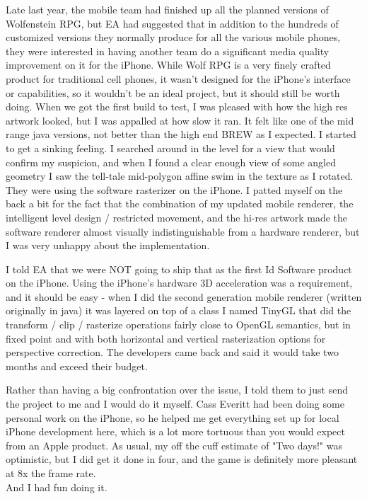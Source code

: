 Late last year, the mobile team had finished up all the planned versions of Wolfenstein RPG, but EA had suggested that in addition to the hundreds of customized versions they normally produce for all the various mobile phones, they were interested in having another team do a significant media quality improvement on it for the iPhone.  While Wolf RPG is a very finely crafted product for traditional cell phones, it wasn't designed for the iPhone's interface or capabilities, so it wouldn't be an ideal project, but it should still be worth doing.  When we got the first build to test, I was pleased with how the high res artwork looked, but I was appalled at how slow it ran.  It felt like one of the mid range java versions, not better than the high end BREW as I expected.  I started to get a sinking feeling.  I searched around in the level for a view that would confirm my suspicion, and when I found a clear enough view of some angled geometry I saw the tell-tale mid-polygon affine swim in the texture as I rotated.  They were using the software rasterizer on the iPhone.  I patted myself on the back a bit for the fact that the combination of my updated mobile renderer, the intelligent level design / restricted movement, and the hi-res artwork made the software renderer almost visually indistinguishable from a hardware renderer, but I was very unhappy about the implementation.\\
\par

I told EA that we were NOT going to ship that as the first Id Software product on the iPhone.  Using the iPhone's hardware 3D acceleration was a requirement, and it should be easy - when I did the second generation mobile renderer (written originally in java) it was layered on top of a class I named TinyGL that did the transform / clip / rasterize operations fairly close to OpenGL semantics, but in fixed point and with both horizontal and vertical rasterization options for perspective correction.  The developers came back and said it would take two months and exceed their budget.\\
\par

Rather than having a big confrontation over the issue, I told them to just send the project to me and I would do it myself.  Cass Everitt had been doing some personal work on the iPhone, so he helped me get everything set up for local iPhone development here, which is a lot more tortuous than you would expect from an Apple product.  As usual, my off the cuff estimate of "Two days!" was optimistic, but I did get it done in four, and the game is definitely more pleasant at 8x the frame rate.\\
And I had fun doing it.\\
\par


